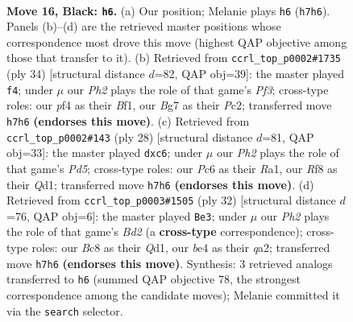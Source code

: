 \documentclass[11pt]{article}
\begin{document}
\clearpage

\begin{figure}[p]\centering
\begin{subfigure}{0.46\textwidth}\centering
\resizebox{\linewidth}{!}{%
\newchessgame
\chessboard[
  setfen={1rbq1rk1/p2pppbp/2p5/7Q/P1P1BP2/2N3P1/1P6/R1B2RK1 b - - 0 16},
  showmover=false,
  pgfstyle=straightmove, color=movearrow, markmove={h7-h6}
]}
\caption{}
\end{subfigure}\hfill
\begin{subfigure}{0.46\textwidth}\centering
\resizebox{\linewidth}{!}{%
\newchessgame
\chessboard[
  setfen={rq2kb1r/5pp1/p1b1p2p/8/P5P1/1p2BP2/1PP2Q1P/2KR1BR1 w kq - 0 18},
  showmover=false,
  pgfstyle=straightmove, color=movearrow, markmove={f3-f4}
]}
\caption{}
\end{subfigure}
\\[4pt]
\begin{subfigure}{0.46\textwidth}\centering
\resizebox{\linewidth}{!}{%
\newchessgame
\chessboard[
  setfen={r1b1k2r/5ppp/p1p2n2/2qPp3/8/8/PP1B1PPP/R2QKB1R w KQkq - 0 15},
  showmover=false,
  pgfstyle=straightmove, color=movearrow, markmove={d5-c6}
]}
\caption{}
\end{subfigure}\hfill
\begin{subfigure}{0.46\textwidth}\centering
\resizebox{\linewidth}{!}{%
\newchessgame
\chessboard[
  setfen={r1b2rk1/pp2pp1p/6p1/3Pb3/4P3/5B1P/q2B1PP1/1R1Q1RK1 w - - 1 17},
  showmover=false,
  pgfstyle=straightmove, color=movearrow, markmove={d2-e3}
]}
\caption{}
\end{subfigure}
\caption{\textbf{Move 16, Black: \texttt{h6}.} (a) Our position; Melanie plays \texttt{h6} (\texttt{h7h6}). Panels (b)--(d) are the retrieved master positions whose correspondence most drove this move (highest QAP objective among those that transfer to it). (b) Retrieved from \texttt{ccrl\_top\_p0002\#1735} (ply 34) [structural distance $d$=82, QAP obj=39]: the master played \texttt{f4}; under $\mu$ our \emph{Ph2} plays the role of that game's \emph{Pf3}; cross-type roles: our \emph{p}f4 as their \emph{B}f1, our \emph{B}g7 as their \emph{P}c2; transferred move \texttt{h7h6} \textbf{(endorses this move)}. (c) Retrieved from \texttt{ccrl\_top\_p0002\#143} (ply 28) [structural distance $d$=81, QAP obj=33]: the master played \texttt{dxc6}; under $\mu$ our \emph{Ph2} plays the role of that game's \emph{Pd5}; cross-type roles: our \emph{P}c6 as their \emph{R}a1, our \emph{R}f8 as their \emph{Q}d1; transferred move \texttt{h7h6} \textbf{(endorses this move)}. (d) Retrieved from \texttt{ccrl\_top\_p0003\#1505} (ply 32) [structural distance $d$=76, QAP obj=6]: the master played \texttt{Be3}; under $\mu$ our \emph{Ph2} plays the role of that game's \emph{Bd2} (a \textbf{cross-type} correspondence); cross-type roles: our \emph{B}c8 as their \emph{Q}d1, our \emph{b}e4 as their \emph{q}a2; transferred move \texttt{h7h6} \textbf{(endorses this move)}. Synthesis: 3 retrieved analogs transferred to \texttt{h6} (summed QAP objective 78, the strongest correspondence among the candidate moves); Melanie committed it via the \texttt{search} selector.}
\label{fig:thought-m31}
\end{figure}
\end{document}

